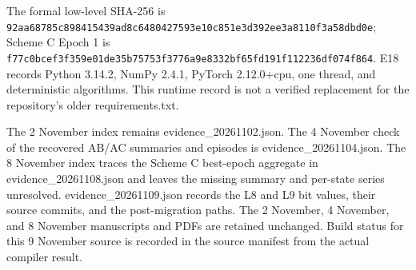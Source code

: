 The formal low-level SHA-256 is \nolinkurl{92aa68785c898415439ad8c6480427593e10c851e3d392ee3a8110f3a58dbd0e}; Scheme C Epoch 1 is \nolinkurl{f77c0bcef3f359e01de35b75753f3776a9e8332bf65fd191f112236df074f864}. E18 records Python 3.14.2, NumPy 2.4.1, PyTorch 2.12.0+cpu, one thread, and deterministic algorithms. This runtime record is not a verified replacement for the repository's older requirements.txt.

The 2 November index remains evidence\_20261102.json. The 4 November check of the recovered AB/AC summaries and episodes is evidence\_20261104.json. The 8 November index traces the Scheme C best-epoch aggregate in evidence\_20261108.json and leaves the missing summary and per-state series unresolved. evidence\_20261109.json records the L8 and L9 bit values, their source commits, and the post-migration paths. The 2 November, 4 November, and 8 November manuscripts and PDFs are retained unchanged. Build status for this 9 November source is recorded in the source manifest from the actual compiler result.
